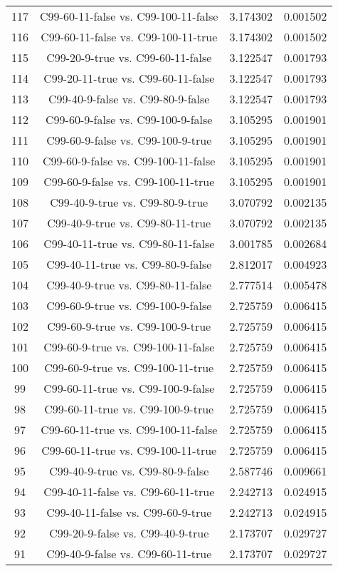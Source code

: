 \documentclass[a4paper,10pt]{article}
\begin{document}
\begin{landscape}
\begin{table}[!htp]
\begin{tabular}{cccc}
117&C99-60-11-false vs. C99-100-11-false&3.174302&0.001502\\
116&C99-60-11-false vs. C99-100-11-true&3.174302&0.001502\\
115&C99-20-9-true vs. C99-60-11-false&3.122547&0.001793\\
114&C99-20-11-true vs. C99-60-11-false&3.122547&0.001793\\
113&C99-40-9-false vs. C99-80-9-false&3.122547&0.001793\\
112&C99-60-9-false vs. C99-100-9-false&3.105295&0.001901\\
111&C99-60-9-false vs. C99-100-9-true&3.105295&0.001901\\
110&C99-60-9-false vs. C99-100-11-false&3.105295&0.001901\\
109&C99-60-9-false vs. C99-100-11-true&3.105295&0.001901\\
108&C99-40-9-true vs. C99-80-9-true&3.070792&0.002135\\
107&C99-40-9-true vs. C99-80-11-true&3.070792&0.002135\\
106&C99-40-11-true vs. C99-80-11-false&3.001785&0.002684\\
105&C99-40-11-true vs. C99-80-9-false&2.812017&0.004923\\
104&C99-40-9-true vs. C99-80-11-false&2.777514&0.005478\\
103&C99-60-9-true vs. C99-100-9-false&2.725759&0.006415\\
102&C99-60-9-true vs. C99-100-9-true&2.725759&0.006415\\
101&C99-60-9-true vs. C99-100-11-false&2.725759&0.006415\\
100&C99-60-9-true vs. C99-100-11-true&2.725759&0.006415\\
99&C99-60-11-true vs. C99-100-9-false&2.725759&0.006415\\
98&C99-60-11-true vs. C99-100-9-true&2.725759&0.006415\\
97&C99-60-11-true vs. C99-100-11-false&2.725759&0.006415\\
96&C99-60-11-true vs. C99-100-11-true&2.725759&0.006415\\
95&C99-40-9-true vs. C99-80-9-false&2.587746&0.009661\\
94&C99-40-11-false vs. C99-60-11-true&2.242713&0.024915\\
93&C99-40-11-false vs. C99-60-9-true&2.242713&0.024915\\
92&C99-20-9-false vs. C99-40-9-true&2.173707&0.029727\\
91&C99-40-9-false vs. C99-60-11-true&2.173707&0.029727\\

\end{tabular}
\end{table}
\end{landscape}
\end{document}
